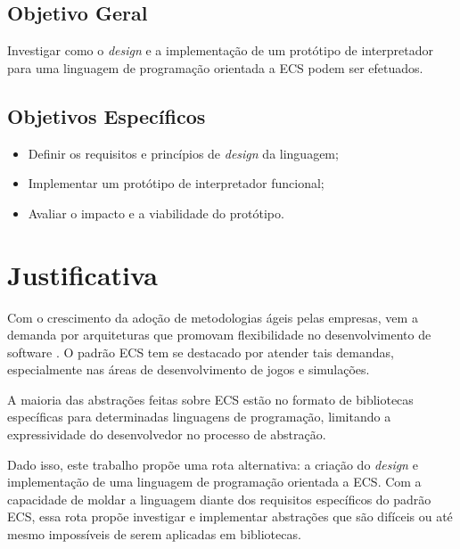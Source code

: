 \subsection{Objetivo Geral}\label{sec:obj_geral}

Investigar como o \textit{design} e a implementação de um protótipo de interpretador para uma linguagem de programação orientada a ECS podem ser efetuados.

\subsection{Objetivos Específicos}

\begin{itemize}
    \item Definir os requisitos e princípios de \textit{design} da linguagem;
    \item Implementar um protótipo de interpretador funcional;
    \item Avaliar o impacto e a viabilidade do protótipo.
\end{itemize}

\section{Justificativa}

Com o crescimento da adoção de metodologias ágeis pelas empresas, vem a demanda por arquiteturas que promovam flexibilidade no desenvolvimento de software \cite{flightdynamics}. O padrão ECS tem se destacado por atender tais demandas, especialmente nas áreas de desenvolvimento de jogos e simulações.

A maioria das abstrações feitas sobre ECS estão no formato de bibliotecas específicas para determinadas linguagens de programação, limitando a expressividade do desenvolvedor no processo de abstração.

Dado isso, este trabalho propõe uma rota alternativa: a criação do \textit{design} e implementação de uma linguagem de programação orientada a ECS. Com a capacidade de moldar a linguagem diante dos requisitos específicos do padrão ECS, essa rota propõe investigar e implementar abstrações que são difíceis ou até mesmo impossíveis de serem aplicadas em bibliotecas.
